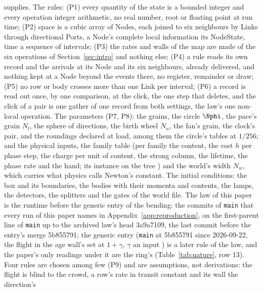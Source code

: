 supplies. The rules: (P1) every quantity of the state is a bounded
integer and every operation integer arithmetic, no real number, root or
floating point at run time; (P2) space is a cubic array of Nodes, each
joined to six neighbours by Links through directional Ports, a Node's
complete local information its NodeState, time a sequence of intervals;
(P3) the rates and walls of the map are made of the six operations of
Section~\ref{sec:intro} and nothing else; (P4) a rule reads its own
record and the arrivals at its Node and its six neighbours, already
delivered, and nothing kept at a Node beyond the events there, no
register, remainder or draw; (P5) no row or body crosses more than one
Link per interval; (P6) a record is read out once, by one comparison,
at the click, the one step that deletes, and the click of a pair is one
gather of one record from both settings, the law's one non-local
operation. The parameters (P7, P8): the grains, the circle $\Nphi$, the
pace's grain $N_l$, the sphere of directions, the birth wheel $N_u$, the
fan's grain, the clock's pair, and the roundings declared at load,
among them the circle's tables at $1/256$; and the physical inputs, the
family table (per family the content, the cost $h$ per phase step, the
charge per unit of content, the strong column, the lifetime, the phase
rate and the hand; its instance on the tree \cite{familiesaudit}) and
the world's width $N_w$, which carries what physics calls Newton's
constant. The initial conditions: the box and its boundaries, the
bodies with their momenta and contents, the lamps, the detectors, the
splitters and the gates of the world file. The law of this paper is the runtime before the generic entry of the bending: the commits of \texttt{main} that every run of this paper names in Appendix~\ref{app:reproduction}, on the first-parent line of \texttt{main} up to the archived law's head 3a9a7109, the last commit before the entry's merge 5b855791; the generic entry (\texttt{main} at 5b855791 since 2026-09-22, the flight in the age wall's set at $1 + \gamma$, $\gamma$ an input \cite{genericentry}) is a later rule of the law, and the paper's only readings under it are the ring's (Table~\ref{tab:nature}, row 13). Four rules are chosen among few (P9) and are assumptions, not derivations: the flight is blind to the crowd, a row's rate in transit constant and its wall the direction's
